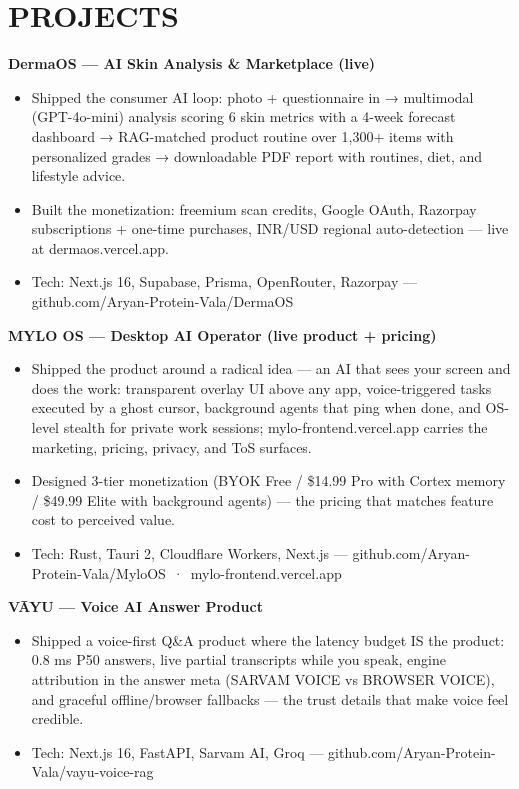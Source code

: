 \documentclass[9pt]{article}
\begin{document}
\section*{PROJECTS}
\textbf{DermaOS  ---  AI Skin Analysis \& Marketplace (live)}
\vspace{1pt}
\begin{itemize}[leftmargin=11pt,itemsep=0pt,topsep=1pt,parsep=0pt]
\item Shipped the consumer AI loop: photo + questionnaire in → multimodal (GPT-4o-mini) analysis scoring 6 skin metrics with a 4-week forecast dashboard → RAG-matched product routine over 1,300+ items with personalized grades → downloadable PDF report with routines, diet, and lifestyle advice.
\item Built the monetization: freemium scan credits, Google OAuth, Razorpay subscriptions + one-time purchases, INR/USD regional auto-detection  ---  live at dermaos.vercel.app.
\item Tech: Next.js 16, Supabase, Prisma, OpenRouter, Razorpay  ---  github.com/Aryan-Protein-Vala/DermaOS
\end{itemize}
\textbf{MYLO OS  ---  Desktop AI Operator (live product + pricing)}
\vspace{1pt}
\begin{itemize}[leftmargin=11pt,itemsep=0pt,topsep=1pt,parsep=0pt]
\item Shipped the product around a radical idea  ---  an AI that sees your screen and does the work: transparent overlay UI above any app, voice-triggered tasks executed by a ghost cursor, background agents that ping when done, and OS-level stealth for private work sessions; mylo-frontend.vercel.app carries the marketing, pricing, privacy, and ToS surfaces.
\item Designed 3-tier monetization (BYOK Free / \$14.99 Pro with Cortex memory / \$49.99 Elite with background agents)  ---  the pricing that matches feature cost to perceived value.
\item Tech: Rust, Tauri 2, Cloudflare Workers, Next.js  ---  github.com/Aryan-Protein-Vala/MyloOS \,·\, mylo-frontend.vercel.app
\end{itemize}
\textbf{VĀYU  ---  Voice AI Answer Product}
\vspace{1pt}
\begin{itemize}[leftmargin=11pt,itemsep=0pt,topsep=1pt,parsep=0pt]
\item Shipped a voice-first Q\&A product where the latency budget IS the product: 0.8 ms P50 answers, live partial transcripts while you speak, engine attribution in the answer meta (SARVAM VOICE vs BROWSER VOICE), and graceful offline/browser fallbacks  ---  the trust details that make voice feel credible.
\item Tech: Next.js 16, FastAPI, Sarvam AI, Groq  ---  github.com/Aryan-Protein-Vala/vayu-voice-rag
\end{itemize}
\end{document}
